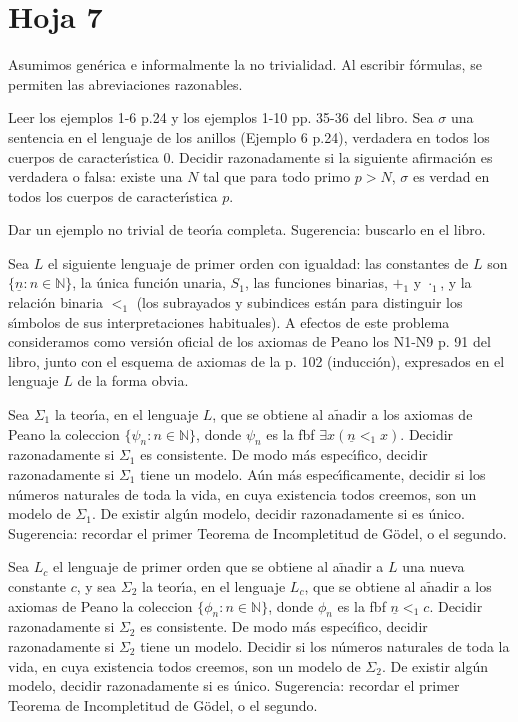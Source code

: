 \section{Hoja 7}

Asumimos genérica e informalmente la no trivialidad. Al escribir fórmulas, se permiten
las abreviaciones razonables.

\begin{problem}
Leer los ejemplos 1-6 p.24 y los ejemplos 1-10  pp. 35-36 del libro. Sea $\sigma$
una sentencia en el lenguaje de los anillos (Ejemplo 6 p.24), verdadera en todos los
cuerpos de caracter\'{\i}stica 0. Decidir razonadamente si la siguiente afirmaci\'on
es verdadera o falsa: existe una $N$ tal que para todo primo $p > N$, $\sigma$ es verdad
en todos los cuerpos de caracter\'{\i}stica $p$.
\solution
\end{problem}

\begin{problem}
Dar un ejemplo no trivial de teor\'{\i}a completa. Sugerencia: buscarlo en el libro.
\solution
\end{problem}

\begin{problem}
Sea  $L$  el siguiente lenguaje de primer orden  con igualdad: las constantes de $L$ son
$\{\underline{n}: n\in\mathbb{N}\}$, la \'unica funci\'on unaria, $S_1$, las funciones binarias,
$+_1$ y $\cdot_1$, y la relaci\'on binaria $<_1$ (los subrayados y subindices est\'an para
distinguir los s\'{\i}mbolos de sus interpretaciones habituales). A efectos de este problema
consideramos como versi\'on oficial de los axiomas de Peano los N1-N9 p. 91 del libro, junto con el esquema
de axiomas de la p. 102 (inducci\'on), expresados en el lenguaje $L$ de la forma
obvia.

\ppart Sea $\Sigma_1$ la teor\'{\i}a,
 en el lenguaje $L$, que se obtiene al a$\operatorname{\tilde{n}}$adir a los
axiomas de Peano la coleccion $\{ \psi_n: n\in\mathbb{N}\}$, donde
$\psi_n$ es la fbf $\exists x (\underline{n} <_1 x )$.
 Decidir razonadamente si
$\Sigma_1$ es consistente. De modo m\'as espec\'{\i}fico, decidir razonadamente si $\Sigma_1$ tiene un modelo.  A\'un m\'as espec\'{\i}ficamente, decidir si los n\'umeros naturales
de toda la vida, en cuya existencia todos creemos,  son un modelo de $\Sigma_1$.
De existir alg\'un modelo, decidir razonadamente si es \'unico.
Sugerencia: recordar el primer Teorema de Incompletitud de G\"odel, o el segundo.

\ppart Sea $L_c$ el lenguaje de primer orden que se obtiene al a$\operatorname{\tilde{n}}$adir
a $L$ una nueva constante $c$, y sea
$\Sigma_2$ la teor\'{\i}a,
 en el lenguaje $L_c$, que se obtiene al a$\operatorname{\tilde{n}}$adir a los
axiomas de Peano la coleccion $\{ \phi_n: n\in\mathbb{N}\}$, donde
$\phi_n$ es la fbf $\underline{n} <_1 c$.
Decidir razonadamente si
$\Sigma_2$ es consistente. De modo m\'as espec\'{\i}fico, decidir razonadamente si $\Sigma_2$ tiene un modelo.  Decidir si los n\'umeros naturales
de toda la vida, en cuya existencia todos creemos,  son un modelo de $\Sigma_2$.
De existir alg\'un modelo, decidir razonadamente si es \'unico.
Sugerencia: recordar el primer Teorema de Incompletitud de G\"odel, o el segundo.
\solution
\end{problem}
